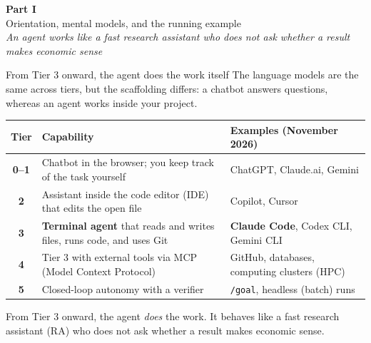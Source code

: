 \documentclass[aspectratio=169,10pt]{beamer}
\newcommand{\partcard}[3]{%
  \begin{frame}{}\vfill\begin{center}
  {\Huge \textcolor{uzhblue}{\textbf{Part #1}}}\\[12pt]{\LARGE #2}\\[14pt]{\large\textcolor{uzhgreydark}{\itshape #3}}
  \end{center}\vfill\end{frame}}
\begin{document}
\partcard{I}{Orientation, mental models, and the running example}{An agent works like a fast research assistant who does not ask whether a result makes economic sense}

\begin{frame}{From Tier 3 onward, the agent does the work itself}
The language models are the same across tiers, but the scaffolding differs: a chatbot answers questions, whereas an agent works inside your project.
\begin{center}
\small
\renewcommand{\arraystretch}{1.3}
\begin{tabular}{@{}c >{\raggedright\arraybackslash}p{6.6cm} >{\raggedright\arraybackslash}p{5.2cm}@{}}
\toprule
\textbf{Tier} & \textbf{Capability} & \textbf{Examples (November 2026)} \\
\midrule
\textbf{0--1} & Chatbot in the browser; you keep track of the task yourself & ChatGPT, Claude.ai, Gemini \\
\textbf{2} & Assistant inside the code editor (IDE) that edits the open file & Copilot, Cursor \\
\rowcolor{softblue!10}
\textbf{3} & \textbf{Terminal agent} that reads and writes files, runs code, and uses Git & \textbf{Claude Code}, Codex CLI, Gemini CLI \\
\rowcolor{softblue!10}
\textbf{4} & Tier 3 with external tools via MCP (Model Context Protocol) & GitHub, databases, computing clusters (HPC) \\
\textbf{5} & Closed-loop autonomy with a verifier & \texttt{/goal}, headless (batch) runs \\
\bottomrule
\end{tabular}
\end{center}

\vspace{0.4em}
From Tier 3 onward, the agent \emph{does} the work. It behaves like a fast research assistant (RA) who does not ask whether a result makes economic sense.
\end{frame}
\end{document}
